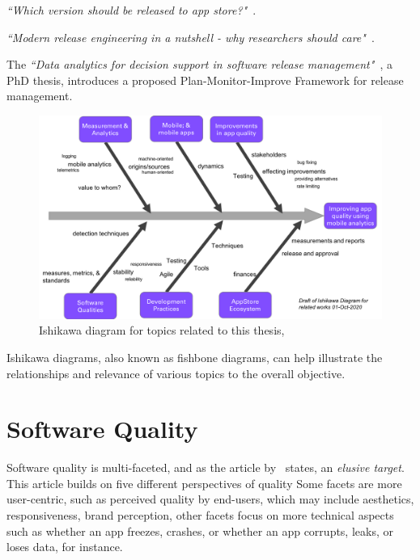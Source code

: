 \emph{``Which version should be released to app store?"}~\cite{nayebi2017version}.
    
\emph{``Modern release engineering in a nutshell - why researchers should care"}~\cite{adams2016modern}.
    
The \emph{``Data analytics for decision support in software release management"}~\cite{didar2018data_analytics_phd_thesis}, a PhD thesis, introduces a proposed Plan-Monitor-Improve Framework for release management.

\clearpage



\begin{figure}[htbp!]
    \centering
    \includegraphics[width=15cm]{images/related-works-ishikawa-diagram-01-oct-2020.png}
    \caption{Ishikawa diagram for topics related to this thesis, }
    \label{fig:related_works_ishikawa_diagram}
\end{figure}

Ishikawa diagrams, also known as fishbone diagrams, can help illustrate the relationships and relevance of various topics to the overall objective. 



\hypertarget{software.quality}{}
\section{Software Quality}
Software quality is multi-faceted, and as the article by~\citep{kitchenham1996_software_quality_elusive_target} states, an \emph{elusive target}. This article builds on five different perspectives of quality Some facets are more user-centric, such as perceived quality by end-users, which may include aesthetics, responsiveness, brand perception, other facets focus on more technical aspects such as whether an app freezes, crashes, or whether an app corrupts, leaks, or loses data, for instance. 


